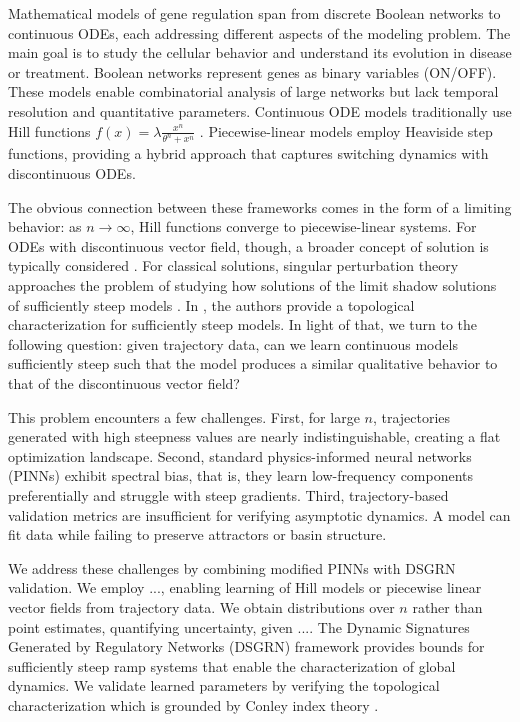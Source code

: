 \documentclass[11pt]{article}
\begin{document}
Mathematical models of gene regulation span from discrete Boolean networks to continuous ODEs, each addressing different aspects of the modeling problem. The main goal is to study the cellular behavior and understand its evolution in disease or treatment. Boolean networks \cite{kauffman1969} represent genes as binary variables (ON/OFF). These models enable combinatorial analysis of large networks but lack temporal resolution and quantitative parameters. Continuous ODE models traditionally use Hill functions $f(x) = \lambda\frac{x^n}{\theta^n + x^n}$ \cite{hill1910}. Piecewise-linear models \cite{glass1973,glass1975} employ Heaviside step functions, providing a hybrid approach that captures switching dynamics with discontinuous ODEs.

The obvious connection between these frameworks comes in the form of a limiting behavior: as $n \to \infty$, Hill functions converge to piecewise-linear systems. For ODEs with discontinuous vector field, though, a broader concept of solution is typically considered \cite{fillipov}. For classical solutions, singular perturbation theory approaches the problem of studying how solutions of the limit shadow solutions of sufficiently steep models \cite{}. In \cite{rookfields}, the authors provide a topological characterization for sufficiently steep models. In light of that, we turn to the following question: given trajectory data, can we learn continuous models sufficiently steep such that the model produces a similar qualitative behavior to that of the discontinuous vector field?

This problem encounters a few challenges. First, for large $n$, trajectories generated with high steepness values are nearly indistinguishable, creating a flat optimization landscape. Second, standard physics-informed neural networks (PINNs) exhibit spectral bias, that is, they learn low-frequency components preferentially and struggle with steep gradients. Third, trajectory-based validation metrics are insufficient for verifying asymptotic dynamics. A model can fit data while failing to preserve attractors or basin structure.

We address these challenges by combining modified PINNs with DSGRN validation. We employ ..., enabling learning of Hill models or piecewise linear vector fields from trajectory data. We obtain distributions over $n$ rather than point estimates, quantifying uncertainty, given .... The Dynamic Signatures Generated by Regulatory Networks (DSGRN) framework \cite{cummins2018,rookfields} provides bounds for sufficiently steep ramp systems that enable the characterization of global dynamics. We validate learned parameters by verifying the topological characterization which is grounded by Conley index theory \cite{conley1978}.
\end{document}
